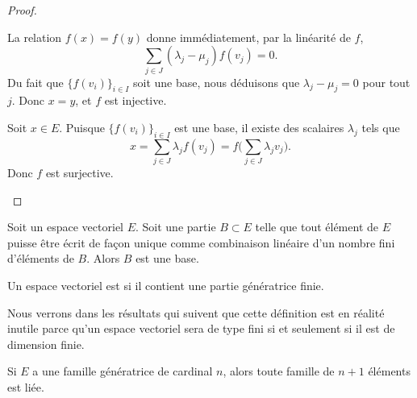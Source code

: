 \begin{proof}
\begin{subproof}
\begin{subproof}
			La relation \( f(x)=f(y)\) donne immédiatement, par la linéarité de \( f\),
			\begin{equation}
				\sum_{j\in J}(\lambda_j-\mu_j)f(v_j)=0.
			\end{equation}
			Du fait que \( \{ f(v_i) \}_{i\in I}\) soit une base, nous déduisons que \( \lambda_j-\mu_j=0\) pour tout \( j\). Donc \( x=y\), et \( f\) est injective.

			\spitem[Surjective]
			Soit \( x\in E\). Puisque \( \{ f(v_i) \}_{i\in I}\) est une base, il existe des scalaires \( \lambda_j\) tels que
			\begin{equation}
				x=\sum_{j\in J}\lambda_jf(v_j)=f\big( \sum_{j\in J}\lambda_jv_j \big).
			\end{equation}
			Donc \( f\) est surjective.
		\end{subproof}
	\end{subproof}
\end{proof}

\begin{proposition}	\label{PROPooVJFNooSbkzTF}
	Soit un espace vectoriel \( E\). Soit une partie \( B\subset E\) telle que tout élément de \( E\) puisse être écrit de façon unique comme combinaison linéaire d'un nombre fini d'éléments de \( B\). Alors \( B\) est une base.
\end{proposition}


\begin{definition}
	Un espace vectoriel est  si il contient une partie génératrice finie.
\end{definition}
Nous verrons dans les résultats qui suivent que cette définition est en réalité inutile parce qu'un espace vectoriel sera de type fini si et seulement si il est de dimension finie.

\begin{lemma}       \label{LemytHnlD}
	Si \( E\) a une famille génératrice de cardinal \( n\), alors toute famille de \( n+1\) éléments est liée.
\end{lemma}

